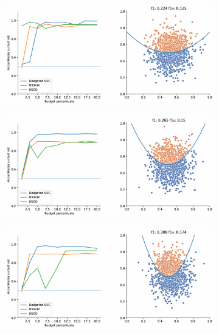 \begin{appendices}
\begin{figure}
\centering
    \begin{subfigure}{.8\textwidth}
        \centering
        \includegraphics[width=\textwidth]{img/comp_new/1.pdf}
    \end{subfigure}
    \hfill
    \begin{subfigure}{.8\textwidth}
        \centering
        \includegraphics[width=\textwidth]{img/comp_new/2.pdf}
    \end{subfigure}
    \hfill
    \begin{subfigure}{.8\textwidth}
        \centering
        \includegraphics[width=\textwidth]{img/comp_new/3.pdf}
    \end{subfigure}

\end{figure}
\end{appendices}
